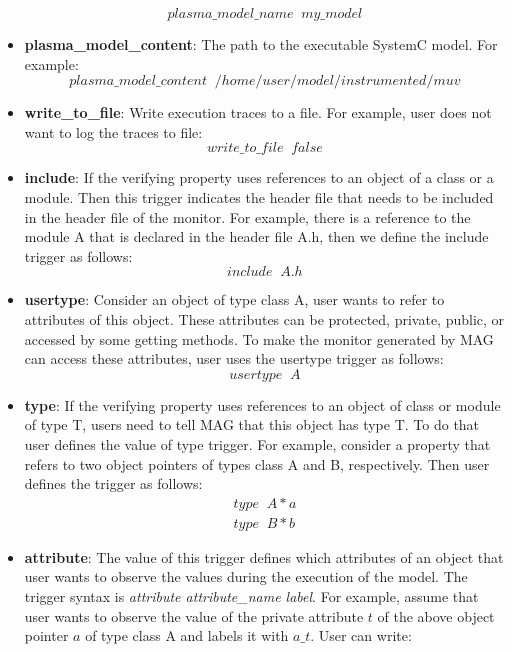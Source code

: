 \documentclass{llncs}
\begin{document}
\begin{itemize}
\begin{displaymath}
plasma\_model\_name \; \; my\_model
\end{displaymath}
\item \textbf{plasma\_model\_content}: The path to the executable SystemC model. For example:
\begin{displaymath}
plasma\_model\_content \; \; /home/user/model/instrumented/muv
\end{displaymath}
\item \textbf{ write\_to\_file}: Write execution traces to a file. For example, user does not want to log the traces to file:
\begin{displaymath}
write\_to\_file  \; \; false
\end{displaymath}
\item \textbf{include}: If the verifying property uses references to an object of a class or a module. Then this trigger indicates the header file that needs to be included in the header file of the monitor. For example, there is a reference to the module A that is declared in the header file A.h, then we define the include trigger as follows:
\begin{displaymath}
include \; \; A.h
\end{displaymath}
\item \textbf{usertype}: Consider an object of type class A, user wants to refer to attributes of this object. These attributes can be protected, private, public, or accessed by some getting methods. To make the monitor generated by MAG can access these attributes, user uses the usertype trigger as follows:
\begin{displaymath}
usertype \; \; A
\end{displaymath}
\item \textbf{type}: If the verifying property uses references to an object of class or module of type T, users need to tell MAG that this object has type T. To do that user defines the value of type trigger. For example, consider a property that refers to two object pointers of types class A and B, respectively. Then user defines the trigger as follows:
\begin{displaymath}
\begin{array}{ll}
type \; \; A* a\\
type \; \; B* b
\end{array}
\end{displaymath}
\item \textbf{attribute}: The value of this trigger defines which attributes of an object that user wants to observe the values during the execution of the model. The trigger syntax is \textit{attribute attribute\_name label}. For example, assume that user wants to observe the value of the private attribute $t$ of the above object pointer $a$ of type class A and labels it with $a\_t$. User can write:

\end{itemize}
\end{document}
